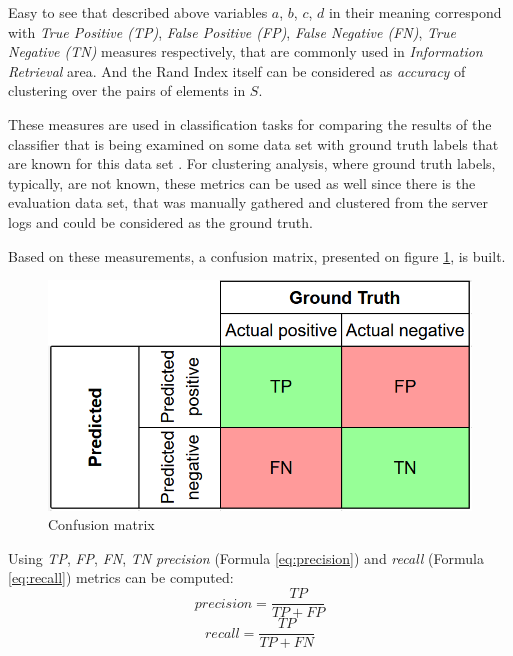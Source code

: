\documentclass[thesis=M,english]{FITthesis}[2019/12/23]
\begin{document}
Easy to see that described above variables \(a\), \(b\), \(c\), \(d\) in their meaning correspond with \textit{True Positive (TP)}, \textit{False Positive (FP)}, \textit{False Negative (FN)}, \textit{True Negative (TN)} measures respectively, that are commonly used in \textit{Information Retrieval} area. And the Rand Index itself can be considered as \textit{accuracy} of clustering over the pairs of elements in \(S\).

These measures are used in classification tasks for comparing the results of the classifier that is being examined on some data set with ground truth labels that are known for this data set \cite{quality-metrics}. For clustering analysis, where ground truth labels, typically, are not known,  these metrics can be used as well since there is the evaluation data set, that was manually gathered and clustered from the server logs and could be considered as the ground truth.

Based on these measurements, a confusion matrix, presented on figure \ref{fig:confusion-matrix}, is built.

\begin{figure}[h!]\centering
	\includegraphics[scale=0.55]{confusion_matrix}
	\caption{Confusion matrix}\label{fig:confusion-matrix}
\end{figure}

Using \textit{TP}, \textit{FP}, \textit{FN}, \textit{TN} \textit{precision} (Formula \ref{eq:precision}) and \textit{recall} (Formula \ref{eq:recall}) metrics can be computed:
\begin{equation}\label{eq:precision}
	precision = \frac{TP}{TP + FP}
\end{equation}
\begin{equation}\label{eq:recall}
	recall = \frac{TP}{TP + FN}
\end{equation}
\end{document}
